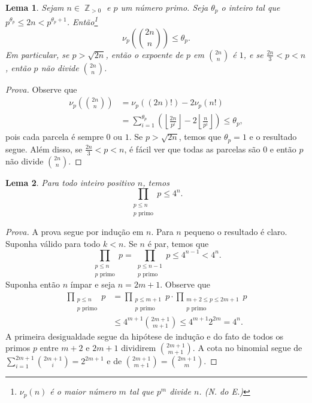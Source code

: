\documentclass{hipatia}
\DeclareMathOperator{\Z}{\mathbb{Z}}
\newtheorem{lemma*}{Lema}
\begin{document}
\begin{lemma*}\label{aff:1}
Sejam $n \in \Z_{>0}$ e $p$ um número primo. Seja $\theta_p$ o inteiro tal que $p^{\theta_p} \le 2n < p^{\theta_p+1}$. Então\footnote{\(\nu_p(n)\) é o maior número $m$ tal que $p^m$ divide $n$. (N. do E.)}
\[\nu_p\left(\binom{2n}{n}\right) \le\theta_p.\]
Em particular, se $p>\sqrt{2n}$, então o expoente de $p$ em $\binom{2n}{n}$ é $1$, e se $\frac{2n}{3} < p < n$, então $p$ não divide $\binom{2n}{n}$.
\end{lemma*}

\begin{proof}[Prova]
Observe que
\begin{align*}
    \nu_p\left(\binom{2n}{n}\right)&=\nu_p((2n)!)-2\nu_p(n!) \\
    &=\sum_{i=1}^{\theta_p}\left(\left\lfloor{\frac{2n}{p^i}}\right\rfloor-2\left\lfloor{\frac{n}{p^i}}\right\rfloor\right)\le \theta_p,
\end{align*}
pois cada parcela é sempre $0$ ou $1$. Se $p>\sqrt{2n}$, temos que $\theta_p=1$ e o resultado segue. Além disso, se $\frac{2n}{3}<p<n$, é fácil ver que todas as parcelas são $0$ e então $p$ não divide $\binom{2n}{n}$.
\end{proof}

\begin{lemma*}\label{aff:2}
Para todo inteiro positivo $n$, temos 
\[\prod_{\substack{p \le n\\p\text{ primo}}}p \le 4^n.\]
\end{lemma*}

\begin{proof}[Prova]
A prova segue por indução em $n$. Para $n$ pequeno o resultado é claro. Suponha válido para todo $k < n$. Se $n$ é par, temos que
\[\prod_{\substack{p \le n\\p\text{ primo}}}p = \prod_{\substack{p \le n-1\\p\text{ primo}}}p \le 4^{n-1} < 4^n.\]
Suponha então $n$ ímpar e seja $n=2m+1$. Observe que
\begin{align*}
    \prod_{\substack{p \le n\\p\text{ primo}}}p &= \prod_{\substack{p \le m+1\\p\text{ primo}}}p\cdot\prod_{\substack{m+2 \le p \le 2m+1\\p\text{ primo}}}p \\
    &\le 4^{m+1}\binom{2m+1}{m+1} \le 4^{m+1}2^{2m}=4^n.
\end{align*}
A primeira desigualdade segue da hipótese de indução e do fato de todos os primos $p$ entre $m+2$ e $2m+1$ dividirem $\binom{2m+1}{m+1}$. A cota no binomial segue de $\sum_{i=1}^{2m+1} \binom{2m+1}{i}=2^{2m+1}$ e de $\binom{2m+1}{m+1}=\binom{2m+1}{m}$.
\end{proof}
\end{document}
